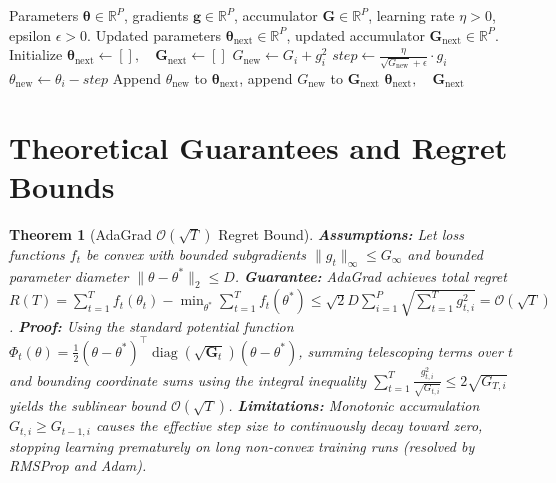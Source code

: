 \documentclass[11pt]{article}
\newtheorem{theorem}{Theorem}
\begin{document}
\begin{algorithm}[H]
\caption{AdaGrad Adaptive Optimizer Step Evaluation}
\label{alg:adagrad}
\begin{algorithmic}[1]
\Require Parameters $\boldsymbol{\theta} \in \mathbb{R}^P$, gradients $\mathbf{g} \in \mathbb{R}^P$, accumulator $\mathbf{G} \in \mathbb{R}^P$, learning rate $\eta > 0$, epsilon $\epsilon > 0$.
\Ensure Updated parameters $\boldsymbol{\theta}_{\mathrm{next}} \in \mathbb{R}^P$, updated accumulator $\mathbf{G}_{\mathrm{next}} \in \mathbb{R}^P$.
\State Initialize $\boldsymbol{\theta}_{\mathrm{next}} \gets [], \quad \mathbf{G}_{\mathrm{next}} \gets []$
    \State $G_{\mathrm{new}} \gets G_i + g_i^2$
    \State $step \gets \frac{\eta}{\sqrt{G_{\mathrm{new}}} + \epsilon} \cdot g_i$
    \State $\theta_{\mathrm{new}} \gets \theta_i - step$
    \State Append $\theta_{\mathrm{new}}$ to $\boldsymbol{\theta}_{\mathrm{next}}$, append $G_{\mathrm{new}}$ to $\mathbf{G}_{\mathrm{next}}$
\EndFor
\State \Return $\boldsymbol{\theta}_{\mathrm{next}}, \quad \mathbf{G}_{\mathrm{next}}$
\end{algorithmic}
\end{algorithm}

\section{Theoretical Guarantees and Regret Bounds}
\label{sec:guarantees}

\begin{theorem}[AdaGrad $\mathcal{O}(\sqrt{T})$ Regret Bound]
\label{thm:adagrad_regret}
\textbf{Assumptions:} Let loss functions $f_t$ be convex with bounded subgradients $\|g_t\|_\infty \le G_{\infty}$ and bounded parameter diameter $\|\theta - \theta^*\|_2 \le D$.
\textbf{Guarantee:} AdaGrad achieves total regret $R(T) = \sum_{t=1}^T f_t(\theta_t) - \min_{\theta^*} \sum_{t=1}^T f_t(\theta^*) \le \sqrt{2} D \sum_{i=1}^P \sqrt{\sum_{t=1}^T g_{t, i}^2} = \mathcal{O}(\sqrt{T})$.
\textbf{Proof:}
Using the standard potential function $\Phi_t(\theta) = \frac{1}{2} (\theta - \theta^*)^\top \operatorname{diag}(\sqrt{\mathbf{G}_t}) (\theta - \theta^*)$, summing telescoping terms over $t$ and bounding coordinate sums using the integral inequality $\sum_{t=1}^T \frac{g_{t, i}^2}{\sqrt{G_{t, i}}} \le 2\sqrt{G_{T, i}}$ yields the sublinear bound $\mathcal{O}(\sqrt{T})$.
\textbf{Limitations:} Monotonic accumulation $G_{t, i} \ge G_{t-1, i}$ causes the effective step size to continuously decay toward zero, stopping learning prematurely on long non-convex training runs (resolved by RMSProp and Adam).
\end{theorem}
\end{document}
